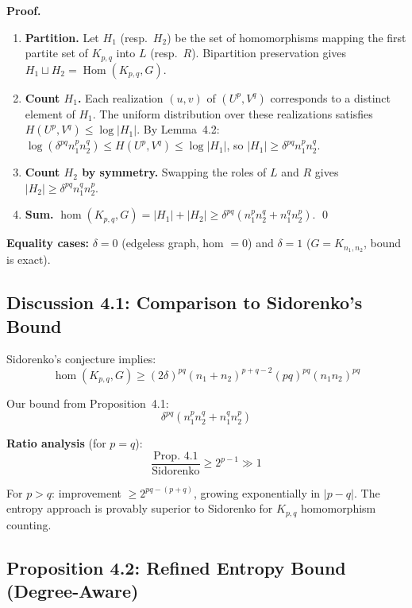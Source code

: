 \documentclass[12pt,a4paper]{article}
\theoremstyle{definition}
\newcommand{\hom}{\operatorname{hom}}
\begin{document}
\textbf{Proof.}
\begin{enumerate}
  \item \textbf{Partition.} Let $H_1$ (resp.\ $H_2$) be the set of homomorphisms mapping the first
    partite set of $K_{p,q}$ into $L$ (resp.\ $R$). Bipartition preservation gives $H_1 \sqcup H_2
    = \operatorname{Hom}(K_{p,q},G)$.

  \item \textbf{Count $H_1$.} Each realization $(u,v)$ of $(U^p, V^q)$ corresponds to a distinct element
    of $H_1$. The uniform distribution over these realizations satisfies
    $H(U^p,V^q) \leq \log|H_1|$.
    By Lemma~4.2: $\log(\delta^{pq}n_1^p n_2^q) \leq H(U^p,V^q) \leq \log|H_1|$,
    so $|H_1| \geq \delta^{pq}n_1^p n_2^q$.

  \item \textbf{Count $H_2$ by symmetry.} Swapping the roles of $L$ and $R$ gives
    $|H_2| \geq \delta^{pq}n_1^q n_2^p$.

  \item \textbf{Sum.} $\hom(K_{p,q},G) = |H_1|+|H_2| \geq \delta^{pq}(n_1^p n_2^q + n_1^q n_2^p)$. \qed
\end{enumerate}

\textbf{Equality cases:} $\delta = 0$ (edgeless graph, hom $= 0$) and $\delta = 1$ ($G = K_{n_1,n_2}$,
bound is exact).

\subsection{Discussion 4.1: Comparison to Sidorenko's Bound}

Sidorenko's conjecture implies:
\[
  \hom(K_{p,q}, G) \geq (2\delta)^{pq}(n_1+n_2)^{p+q-2}(pq)^{pq}(n_1 n_2)^{pq}
\]

Our bound from Proposition~4.1:
\[
  \delta^{pq}(n_1^p n_2^q + n_1^q n_2^p)
\]

\textbf{Ratio analysis} (for $p = q$):
\[
  \frac{\text{Prop.\ 4.1}}{\text{Sidorenko}} \geq 2^{p-1} \gg 1
\]

For $p > q$: improvement $\geq 2^{pq-(p+q)}$, growing exponentially in $|p-q|$. The entropy approach is
provably superior to Sidorenko for $K_{p,q}$ homomorphism counting.

\subsection{Proposition 4.2: Refined Entropy Bound (Degree-Aware)}
\end{document}

